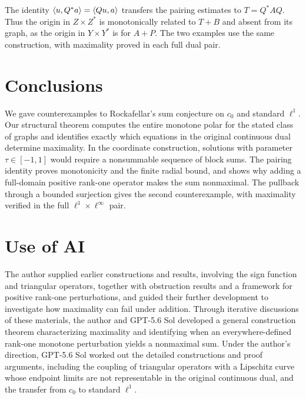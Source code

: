 The identity $\langle u,Q^*a\rangle=\langle Qu,a\rangle$ transfers the pairing
estimates to $T=Q^*AQ$. Thus the origin in $Z\times Z^*$ is
monotonically related to $T+B$ and absent from its graph, as the origin
in $Y\times Y^*$ is for $A+P$. The two examples use the same
construction, with maximality proved in each full dual pair.

\section{Conclusions}
\label{sec:conclusion}

We gave counterexamples to Rockafellar's sum conjecture on $c_0$ and
standard $\ell^1$. Our structural theorem computes the entire monotone
polar for the stated class of graphs and identifies exactly which
equations in the original continuous dual determine maximality. In the
coordinate construction, solutions with parameter $\tau\in[-1,1]$
would require a nonsummable sequence of block sums. The pairing identity
proves monotonicity and the finite radial bound, and shows why adding
a full-domain positive rank-one operator makes the sum nonmaximal.
The pullback through a bounded surjection gives the second counterexample,
with maximality verified in the full $\ell^1\times\ell^\infty$ pair.


\section*{Use of AI}
The author supplied earlier constructions and results, involving the sign function and triangular operators, together with obstruction results and a framework for positive rank-one perturbations, and guided their further development to investigate how maximality can fail under addition. Through iterative discussions of these materials, the author and GPT-5.6 Sol developed a general construction theorem characterizing maximality and identifying when an everywhere-defined rank-one monotone perturbation yields a nonmaximal sum.  Under the author's direction, GPT-5.6 Sol worked out the detailed constructions and proof arguments, including the coupling of triangular operators with a Lipschitz curve whose endpoint limits are not representable in the original continuous dual, and the transfer from $c_0$ to standard $\ell^1$. 






\begingroup
\raggedright


\endgroup


